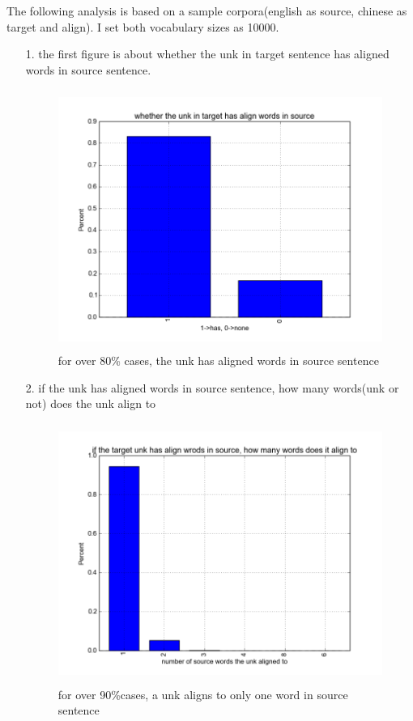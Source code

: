 \documentclass{article}
\begin{document}
The following analysis is based on a sample corpora(english as source, chinese as target and align). I set both vocabulary sizes as 10000.
\begin{itemize}

\item[1. ] the first figure is about whether the unk in target sentence has aligned words in source sentence.  
\begin{figure}[H]
\centering
\includegraphics[height=8.5cm]{figure_6.png}
\caption{for over 80\% cases, the unk has aligned words in source sentence}
\end{figure}

\item[2. ] if the unk has aligned words in source sentence, how many words(unk or not) does the unk align to
\begin{figure}[H]
\centering
\includegraphics[height=8.5cm]{figure_1.png}
\caption{for over 90\%cases, a unk aligns to only one word in source sentence}
\end{figure}


\end{itemize}
\end{document}

